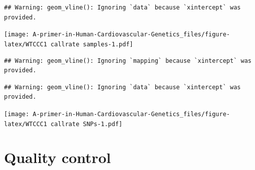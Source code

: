 \documentclass[
]{book}
\newenvironment{Shaded}{\begin{snugshade}}{\end{snugshade}}
\newcommand{\AttributeTok}[1]{\textcolor[rgb]{0.77,0.63,0.00}{#1}}
\newcommand{\ConstantTok}[1]{\textcolor[rgb]{0.00,0.00,0.00}{#1}}
\newcommand{\DecValTok}[1]{\textcolor[rgb]{0.00,0.00,0.81}{#1}}
\newcommand{\FloatTok}[1]{\textcolor[rgb]{0.00,0.00,0.81}{#1}}
\newcommand{\FunctionTok}[1]{\textcolor[rgb]{0.00,0.00,0.00}{#1}}
\newcommand{\NormalTok}[1]{#1}
\newcommand{\OtherTok}[1]{\textcolor[rgb]{0.56,0.35,0.01}{#1}}
\newcommand{\SpecialCharTok}[1]{\textcolor[rgb]{0.00,0.00,0.00}{#1}}
\newcommand{\StringTok}[1]{\textcolor[rgb]{0.31,0.60,0.02}{#1}}
\begin{document}
\begin{verbatim}
## Warning: geom_vline(): Ignoring `data` because `xintercept` was provided.
\end{verbatim}

\texttt{[image: A-primer-in-Human-Cardiovascular-Genetics\_files/figure-latex/WTCCC1 callrate samples-1.pdf]}

\begin{Shaded}
\end{Shaded}

\begin{verbatim}
## Warning: geom_vline(): Ignoring `mapping` because `xintercept` was provided.
\end{verbatim}

\begin{verbatim}
## Warning: geom_vline(): Ignoring `data` because `xintercept` was provided.
\end{verbatim}

\texttt{[image: A-primer-in-Human-Cardiovascular-Genetics\_files/figure-latex/WTCCC1 callrate SNPs-1.pdf]}

\hypertarget{quality-control-1}{%
\section{Quality control}\label{quality-control-1}}
\end{document}

